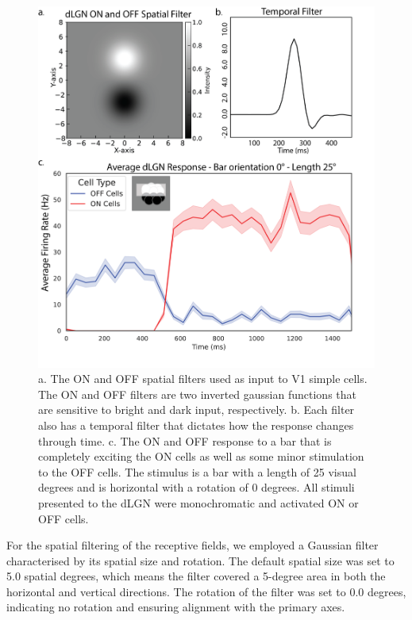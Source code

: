 \documentclass[12pt]{article}
\begin{document}
\begin{figure}[H]
  \centering
  \includegraphics[width=1.0 \textwidth]{adjusted_figures/lgn_response_fig.png}
  \caption{a. The ON and OFF spatial filters used as input to V1 simple cells. The ON and OFF filters are two inverted gaussian functions that are sensitive to bright and dark input, respectively. b. Each filter also has a temporal filter that dictates how the response changes through time. c. The ON and OFF response to a bar that is completely exciting the ON cells as well as some minor stimulation to the OFF cells. The stimulus is a bar with a length of 25 visual degrees and is horizontal with a rotation of 0 degrees. All stimuli presented to the dLGN were monochromatic and activated ON or OFF cells.}
  \label{fig:LIF_connectivity}
\end{figure}

For the spatial filtering of the receptive fields, we employed a Gaussian filter characterised by its spatial size and rotation. The default spatial size was set to 5.0 spatial degrees, which means the filter covered a 5-degree area in both the horizontal and vertical directions. The rotation of the filter was set to 0.0 degrees, indicating no rotation and ensuring alignment with the primary axes.
\end{document}

